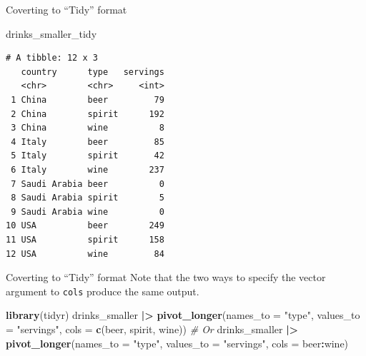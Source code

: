 \documentclass[
  ignorenonframetext,
]{beamer}
\newenvironment{Shaded}{\begin{snugshade}}{\end{snugshade}}
\newcommand{\AttributeTok}[1]{\textcolor[rgb]{0.13,0.29,0.53}{#1}}
\newcommand{\CommentTok}[1]{\textcolor[rgb]{0.56,0.35,0.01}{\textit{#1}}}
\newcommand{\FunctionTok}[1]{\textcolor[rgb]{0.13,0.29,0.53}{\textbf{#1}}}
\newcommand{\NormalTok}[1]{#1}
\newcommand{\SpecialCharTok}[1]{\textcolor[rgb]{0.81,0.36,0.00}{\textbf{#1}}}
\newcommand{\StringTok}[1]{\textcolor[rgb]{0.31,0.60,0.02}{#1}}
\begin{document}
\begin{frame}[fragile]{Coverting to ``Tidy'' format}
\label{coverting-to-tidy-format-1}
\begin{Shaded}
\begin{Highlighting}[]
\NormalTok{drinks\_smaller\_tidy}
\end{Highlighting}
\end{Shaded}

\begin{verbatim}
# A tibble: 12 x 3
   country      type   servings
   <chr>        <chr>     <int>
 1 China        beer         79
 2 China        spirit      192
 3 China        wine          8
 4 Italy        beer         85
 5 Italy        spirit       42
 6 Italy        wine        237
 7 Saudi Arabia beer          0
 8 Saudi Arabia spirit        5
 9 Saudi Arabia wine          0
10 USA          beer        249
11 USA          spirit      158
12 USA          wine         84
\end{verbatim}
\end{frame}

\begin{frame}[fragile]{Coverting to ``Tidy'' format}
\label{coverting-to-tidy-format-2}
Note that the two ways to specify the vector argument to \texttt{cols}
produce the same output.

\normalsize

\begin{Shaded}
\begin{Highlighting}[]
\FunctionTok{library}\NormalTok{(tidyr)}
\NormalTok{drinks\_smaller }\SpecialCharTok{|\textgreater{}} 
  \FunctionTok{pivot\_longer}\NormalTok{(}\AttributeTok{names\_to =} \StringTok{"type"}\NormalTok{, }
               \AttributeTok{values\_to =} \StringTok{"servings"}\NormalTok{, }
               \AttributeTok{cols =} \FunctionTok{c}\NormalTok{(beer, spirit, wine))}
\CommentTok{\# Or}
\NormalTok{drinks\_smaller }\SpecialCharTok{|\textgreater{}} 
  \FunctionTok{pivot\_longer}\NormalTok{(}\AttributeTok{names\_to =} \StringTok{"type"}\NormalTok{, }
               \AttributeTok{values\_to =} \StringTok{"servings"}\NormalTok{, }
               \AttributeTok{cols =}\NormalTok{ beer}\SpecialCharTok{:}\NormalTok{wine)}
\end{Highlighting}
\end{Shaded}

\normalsize
\end{frame}
\end{document}
